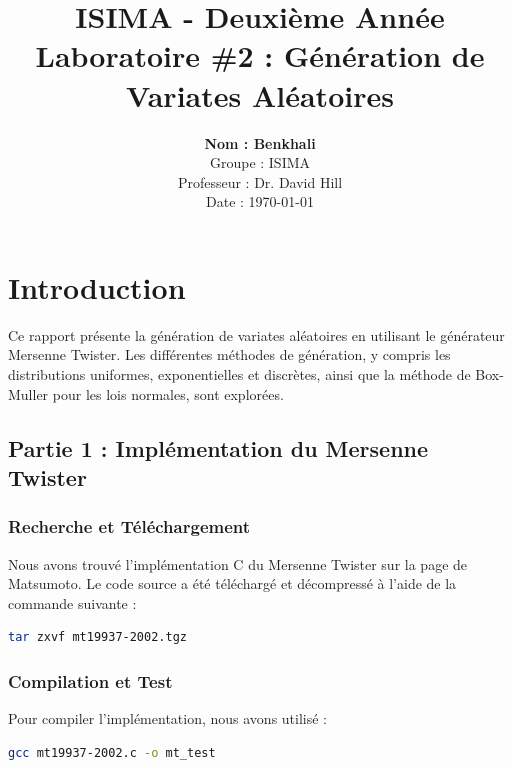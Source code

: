 \documentclass[a4paper,12pt]{report}
\title{
    \textbf{ISIMA - Deuxième Année}\\
    \vspace{1cm}
    \Huge Laboratoire \#2 : Génération de Variates Aléatoires
}
\author{
    \textbf{Nom : Benkhali}\\
    Groupe : ISIMA \\
    Professeur : Dr. David Hill \\
    Date : \today
}
\date{}
\begin{document}
\maketitle %

\newpage

\tableofcontents

\newpage

\chapter*{Introduction} %
Ce rapport présente la génération de variates aléatoires en utilisant le générateur Mersenne Twister. Les différentes méthodes de génération, y compris les distributions uniformes, exponentielles et discrètes, ainsi que la méthode de Box-Muller pour les lois normales, sont explorées.

\newpage
\section*{Partie 1 : Implémentation du Mersenne Twister}

\subsection*{Recherche et Téléchargement}
Nous avons trouvé l'implémentation C du Mersenne Twister sur la page de Matsumoto. Le code source a été téléchargé et décompressé à l'aide de la commande suivante :

\begin{lstlisting}[language=bash]
tar zxvf mt19937-2002.tgz
\end{lstlisting}

\subsection*{Compilation et Test}
Pour compiler l'implémentation, nous avons utilisé :

\begin{lstlisting}[language=bash]
gcc mt19937-2002.c -o mt_test
\end{lstlisting}
\end{document}
